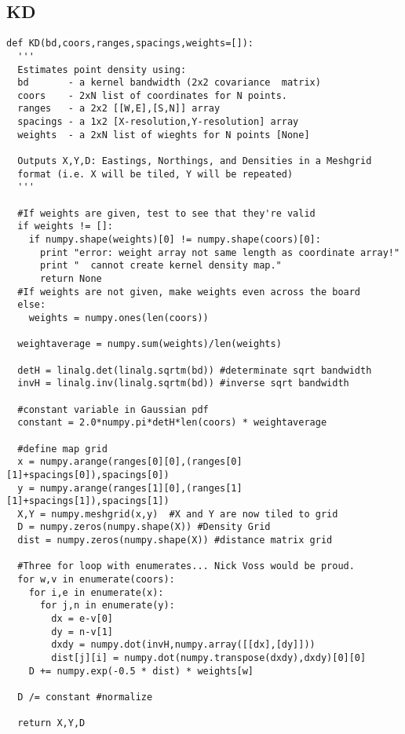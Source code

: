 \subsection{KD}
\begin{verbatim}
def KD(bd,coors,ranges,spacings,weights=[]):
  '''
  Estimates point density using:
  bd       - a kernel bandwidth (2x2 covariance  matrix)
  coors    - 2xN list of coordinates for N points.
  ranges   - a 2x2 [[W,E],[S,N]] array
  spacings - a 1x2 [X-resolution,Y-resolution] array
  weights  - a 2xN list of wieghts for N points [None]
  
  Outputs X,Y,D: Eastings, Northings, and Densities in a Meshgrid
  format (i.e. X will be tiled, Y will be repeated)
  '''
  
  #If weights are given, test to see that they're valid
  if weights != []:
    if numpy.shape(weights)[0] != numpy.shape(coors)[0]:
      print "error: weight array not same length as coordinate array!"
      print "  cannot create kernel density map."
      return None
  #If weights are not given, make weights even across the board
  else:
    weights = numpy.ones(len(coors))
  
  weightaverage = numpy.sum(weights)/len(weights)
  
  detH = linalg.det(linalg.sqrtm(bd)) #determinate sqrt bandwidth
  invH = linalg.inv(linalg.sqrtm(bd)) #inverse sqrt bandwidth
  
  #constant variable in Gaussian pdf
  constant = 2.0*numpy.pi*detH*len(coors) * weightaverage

  #define map grid
  x = numpy.arange(ranges[0][0],(ranges[0][1]+spacings[0]),spacings[0])
  y = numpy.arange(ranges[1][0],(ranges[1][1]+spacings[1]),spacings[1])
  X,Y = numpy.meshgrid(x,y)  #X and Y are now tiled to grid
  D = numpy.zeros(numpy.shape(X)) #Density Grid
  dist = numpy.zeros(numpy.shape(X)) #distance matrix grid
  
  #Three for loop with enumerates... Nick Voss would be proud.
  for w,v in enumerate(coors):
    for i,e in enumerate(x):
      for j,n in enumerate(y):
        dx = e-v[0]
        dy = n-v[1]
        dxdy = numpy.dot(invH,numpy.array([[dx],[dy]]))
        dist[j][i] = numpy.dot(numpy.transpose(dxdy),dxdy)[0][0]
    D += numpy.exp(-0.5 * dist) * weights[w]
  
  D /= constant #normalize
  
  return X,Y,D
\end{verbatim}

